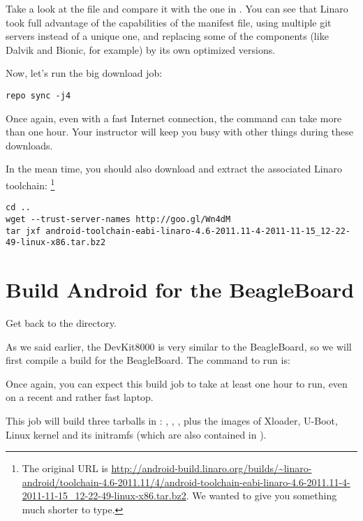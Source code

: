 Take a look at the  file and compare it with
the one in . You can see that
Linaro took full advantage of the capabilities of the manifest file,
using multiple git servers instead of a unique one, and replacing some
of the components (like Dalvik and Bionic, for example) by its own
optimized versions.

Now, let's run the big download job:
\begin{verbatim}
repo sync -j4
\end{verbatim}

Once again, even with a fast Internet connection, the 
command can take more than one hour. Your instructor will keep you
busy with other things during these downloads.

In the mean time, you should also download and extract the associated
Linaro toolchain: \footnote{The original URL is
  \url{http://android-build.linaro.org/builds/~linaro-android/toolchain-4.6-2011.11/4/android-toolchain-eabi-linaro-4.6-2011.11-4-2011-11-15_12-22-49-linux-x86.tar.bz2}. We
  wanted to give you something much shorter to type.}
\begin{verbatim}
cd ..
wget --trust-server-names http://goo.gl/Wn4dM
tar jxf android-toolchain-eabi-linaro-4.6-2011.11-4-2011-11-15_12-22-49-linux-x86.tar.bz2
\end{verbatim}

\section{Build Android for the BeagleBoard}

Get back to the  directory.

As we said earlier, the DevKit8000 is very similar to the BeagleBoard,
so we will first compile a build for the BeagleBoard. The command to
run is:


Once again, you can expect this build job to take at least one hour to
run, even on a recent and rather fast laptop.

This job will build three tarballs in
: ,
, , plus the images of
Xloader, U-Boot, Linux kernel and its initramfs (which are also
contained in ).

